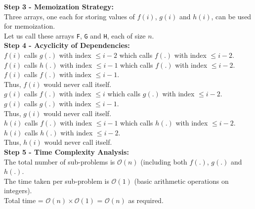 \documentclass[11pt, fleqn]{article}
\begin{document}
\textbf{Step 3 - Memoization Strategy:}\\
Three arrays, one each for storing values of $f(i)$, $g(i)$ and $h(i)$, can be used for memoization.\\
Let us call these arrays \texttt{F}, \texttt{G} and \texttt{H}, each of size $n$.\\

\textbf{Step 4 - Acyclicity of Dependencies:}\\
$f(i)$ calls $g(.)$ with index $\le i-2$ which calls $f(.)$ with index $\le i-2$.\\
$f(i)$ calls $h(.)$ with index $\le i-1$ which calls $f(.)$ with index $\le i-2$.\\
$f(i)$ calls $f(.)$ with index $\le i-1$.\\
Thus, $f(i)$ would never call itself.\\
$g(i)$ calls $f(.)$ with index $\le i$ which calls $g(.)$ with index $\le i-2$.\\
$g(i)$ calls $g(.)$ with index $\le i-1$.\\
Thus, $g(i)$ would never call itself.\\
$h(i)$ calls $f(.)$ with index $\le i-1$ which calls $h(.)$ with index $\le i-2$.\\
$h(i)$ calls $h(.)$ with index $\le i-2$.\\
Thus, $h(i)$ would never call itself.\\

\textbf{Step 5 - Time Complexity Analysis:}\\
The total number of sub-problems is $\mathcal{O}(n)$ (including both $f(.)$, $g(.)$ and $h(.)$.\\
The time taken per sub-problem is $\mathcal{O}(1)$ (basic arithmetic operations on integers).\\
Total time = $\mathcal{O}(n) \times \mathcal{O}(1)$ = $\mathcal{O}(n)$ as required.\\
\end{document}
